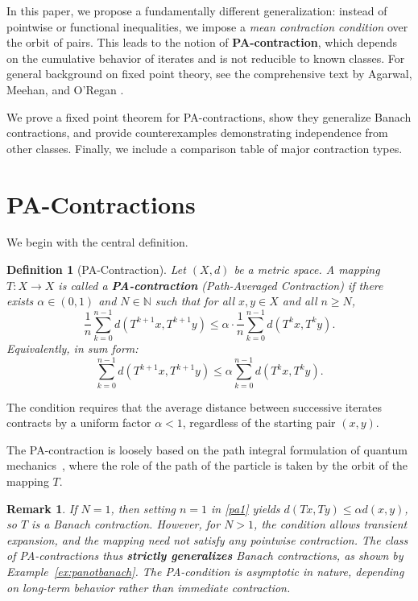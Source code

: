 \documentclass[11pt]{article}
\newtheorem{definition}[theorem]{Definition}
\newtheorem{remark}[theorem]{Remark}
\begin{document}
In this paper, we propose a fundamentally different generalization: instead of pointwise or functional inequalities, we impose a \textit{mean contraction condition} over the orbit of pairs. This leads to the notion of \textbf{PA-contraction}, which depends on the cumulative behavior of iterates and is not reducible to known classes. For general background on fixed point theory, see the comprehensive text by Agarwal, Meehan, and O'Regan \cite{Agarwal2011}.

We prove a fixed point theorem for PA-contractions, show they generalize Banach contractions, and provide counterexamples demonstrating independence from other classes. Finally, we include a comparison table of major contraction types.

\section{PA-Contractions}

We begin with the central definition.

\begin{definition}[PA-Contraction]
Let $ (X,d) $ be a metric space. A mapping $ T: X \to X $ is called a \textbf{PA-contraction} (Path-Averaged Contraction) if there exists $ \alpha \in (0,1) $ 
and $ N \in \mathbb{N}$ such that for all $ x, y \in X $ and all $ n \ge N$,
\begin{equation}
\frac{1}{n} \sum_{k=0}^{n-1} d(T^{k+1}x, T^{k+1}y) \leq \alpha \cdot \frac{1}{n} \sum_{k=0}^{n-1} d(T^k x, T^k y).
\label{pa1}
\end{equation}
Equivalently, in sum form:
\begin{equation}
\sum_{k=0}^{n-1} d(T^{k+1}x, T^{k+1}y) \leq \alpha \sum_{k=0}^{n-1} d(T^k x, T^k y).
\label{pa2}
\end{equation}
\end{definition}

The condition requires that the average distance between successive iterates contracts by a uniform factor $ \alpha < 1 $, regardless of the starting pair $ (x,y) $.

The PA-contraction is loosely based on the path integral formulation of 
quantum mechanics~\cite{fabianopathintegral}, where the role of the path of the particle is taken by the orbit of the mapping $T$. 

\begin{remark}
If $ N = 1 $, then setting $ n = 1 $ in \eqref{pa1} yields $ d(Tx, Ty) \leq \alpha d(x, y) $, so $ T $ is a Banach contraction. However, for $ N > 1 $, the condition allows transient expansion, and the mapping need not satisfy any pointwise contraction. The class of PA-contractions thus \textbf{strictly generalizes} Banach contractions, as shown by Example~\ref{ex:panotbanach}.
The PA-condition is asymptotic in nature, depending on long-term behavior rather than immediate contraction.
\end{remark}
\end{document}
